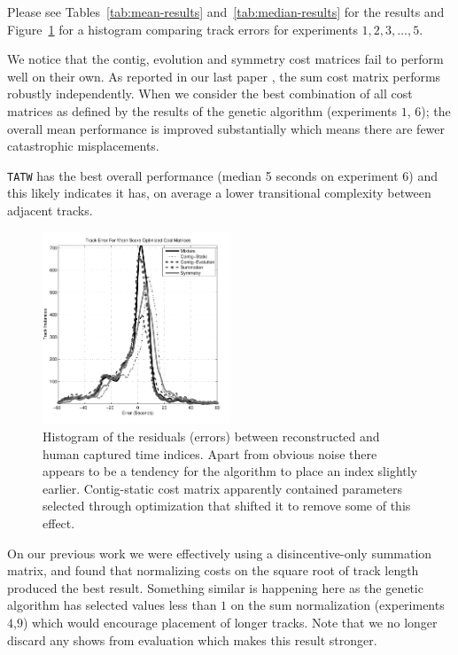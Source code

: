 \documentclass[twocolumn]{article}
\begin{document}
		Please see Tables~\ref{tab:mean-results} and~\ref{tab:median-results} for the results and Figure~\ref{fig:shifthistogram} for a histogram comparing track errors for experiments $1,2,3,\ldots,5$.

		We notice that the contig, evolution and symmetry cost matrices fail to perform well on their own. As reported in our last paper \cite{scarfe2013long}, the sum cost matrix performs robustly independently. When we consider the best combination of all cost matrices as defined by the results of the genetic algorithm (experiments $1$, $6$); the overall mean performance is improved substantially which means there are fewer catastrophic misplacements. 

		\texttt{TATW} has the best overall performance (median 5 seconds on experiment $6$) and this likely indicates it has, on average a lower transitional complexity between adjacent tracks. 


	\begin{figure}
		\centering
		\includegraphics[width=0.5\textwidth]{images/shift_histogram}
		\caption{Histogram of the residuals (errors) between reconstructed and human captured time indices. Apart from obvious noise there appears to be a tendency for the algorithm to place an index slightly earlier. Contig-static cost matrix apparently contained parameters selected through optimization that shifted it to remove some of this effect.    }
		\label{fig:shifthistogram}
	\end{figure} 

On our previous work we were effectively using a disincentive-only summation matrix, and found that normalizing costs on the square root of track length produced the best result. Something similar is happening here as the genetic algorithm has selected values less than $1$ on the sum normalization (experiments $4$,$9$) which would encourage placement of longer tracks. Note that we no longer discard any shows from evaluation which makes this result stronger. 
\end{document}
